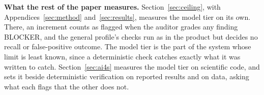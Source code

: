 \textbf{What the rest of the paper measures.} Section~\ref{sec:ceiling}, with
Appendices~\ref{sec:method} and~\ref{sec:results}, measures the model tier on its own. There, an
increment counts as flagged when the auditor grades any finding BLOCKER, and the general profile's
checks run as in the product but decides no recall or false-positive outcome. The model tier is the
part of the system whose limit is least known, since a deterministic check catches exactly what it
was written to catch. Section~\ref{sec:ai4s} measures the model tier on scientific code, and sets
it beside deterministic verification on reported results and on data, asking what each flags that the
other does not.
